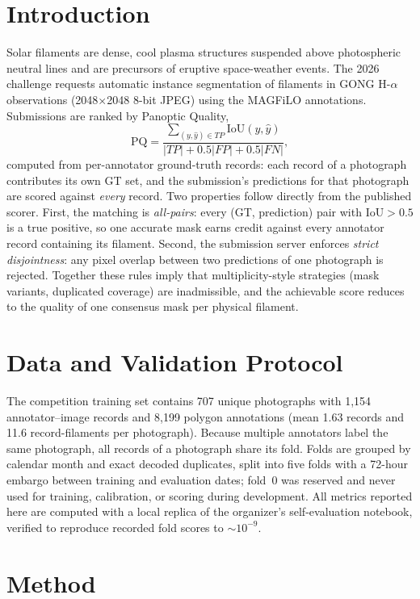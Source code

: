 \documentclass[conference]{IEEEtran}
\begin{document}
\section{Introduction}
Solar filaments are dense, cool plasma structures suspended above photospheric
neutral lines and are precursors of eruptive space-weather events. The 2026 challenge
requests automatic instance segmentation of filaments in GONG H-$\alpha$
observations (2048$\times$2048 8-bit JPEG) using the MAGFiLO annotations. Submissions
are ranked by Panoptic Quality,
\begin{equation}
\mathrm{PQ}=\frac{\sum_{(y,\hat y)\in TP}\mathrm{IoU}(y,\hat y)}
{|TP|+0.5|FP|+0.5|FN|},
\end{equation}
computed from per-annotator ground-truth records: each record of a photograph
contributes its own GT set, and the submission's predictions for that photograph are
scored against \emph{every} record. Two properties follow directly from the published
scorer. First, the matching is \emph{all-pairs}: every (GT, prediction) pair with
$\mathrm{IoU}>0.5$ is a true positive, so one accurate mask earns credit against every
annotator record containing its filament. Second, the submission server enforces
\emph{strict disjointness}: any pixel overlap between two predictions of one
photograph is rejected. Together these rules imply that multiplicity-style strategies
(mask variants, duplicated coverage) are inadmissible, and the achievable score
reduces to the quality of one consensus mask per physical filament.

\section{Data and Validation Protocol}
The competition training set contains 707 unique photographs with 1{,}154
annotator--image records and 8{,}199 polygon annotations (mean 1.63 records and 11.6
record-filaments per photograph). Because multiple annotators label the same
photograph, all records of a photograph share its fold. Folds are grouped by calendar
month and exact decoded duplicates, split into five folds with a 72-hour embargo
between training and evaluation dates; fold~0 was reserved and never used for
training, calibration, or scoring during development. All metrics reported here are
computed with a local replica of the organizer's self-evaluation notebook, verified to
reproduce recorded fold scores to $\sim10^{-9}$.

\section{Method}
\end{document}
